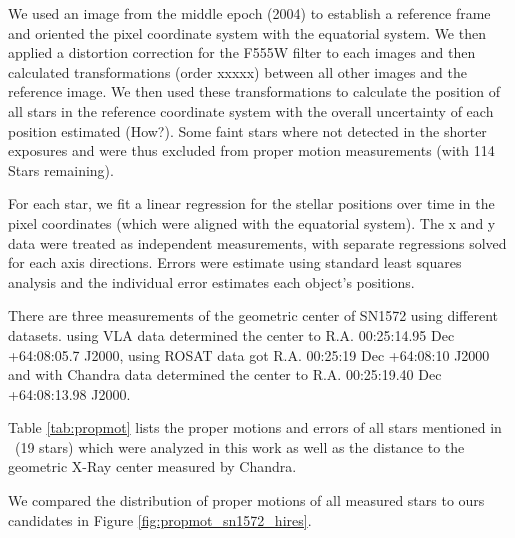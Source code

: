 We used an image from the middle epoch (2004) to establish a reference frame and oriented the pixel coordinate system with the equatorial system. We then applied a distortion correction for the F555W filter \citep{2006acs..rept....1A} to each images and then calculated transformations (order xxxxx) between all other images and the reference image. We then used these transformations to calculate the position of all stars in the reference coordinate system  with the overall uncertainty of each position estimated (How?).
Some faint stars where not detected in the shorter exposures and were thus excluded from proper motion measurements (with 114 Stars remaining).

For each star, we fit a linear regression for the stellar positions over time in the pixel coordinates (which were aligned with the equatorial system). The x and y data were treated as independent measurements, with separate regressions solved for each axis directions. Errors were estimate using standard least squares analysis and the individual error estimates each object's positions.

There are three measurements of the geometric center of SN1572 using different datasets. \cite{1997ApJ...491..816R} using VLA data determined the center to R.A. 00:25:14.95 Dec +64:08:05.7 J2000,  \citet{2000ApJ...545L..53H} using ROSAT data got R.A. 00:25:19 Dec +64:08:10 J2000 and \cite{2005ApJ...634..376W} with Chandra data determined the center to R.A. 00:25:19.40 Dec +64:08:13.98 J2000. 

 Table \ref{tab:propmot} lists the proper motions and errors of all stars mentioned in \rl\ (19 stars) which were analyzed in this work as well as the distance to the geometric X-Ray center measured by Chandra.

We compared the distribution of proper motions of all measured stars to ours candidates in Figure \ref{fig:propmot_sn1572_hires}.

